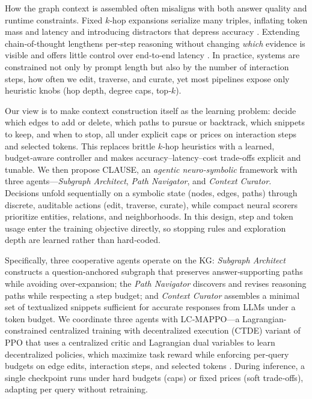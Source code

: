 \documentclass{article} %
\newcommand{\method}{\textsc{CLAUSE}\xspace}
\begin{document}
How the graph context is assembled often misaligns with both answer quality and runtime constraints. Fixed $k$‑hop expansions serialize many triples, inflating token mass and latency \citep{zhou2024efficient,wan2023efficientllms} and introducing distractors that depress accuracy \citep{jiang2019adversarialhotpot}. Extending chain‑of‑thought \citep{wei2022cot,kojima2022zeroshot} lengthens per‑step reasoning without changing \emph{which} evidence is visible and offers little control over end‑to‑end latency \citep{zhou2024efficient}. In practice, systems are constrained not only by prompt length but also by the number of interaction steps, how often we edit, traverse, and curate, yet most pipelines expose only heuristic knobs (hop depth, degree caps, top‑$k$).

Our view is to make context construction itself as the learning problem: decide which edges to add or delete, which paths to pursue or backtrack, which snippets to keep, and when to stop, all under explicit caps or prices on interaction steps and selected tokens. This replaces brittle $k$‑hop heuristics with a learned, budget‑aware controller and makes accuracy–latency–cost trade‑offs explicit and tunable. We then propose \method, an \emph{agentic neuro‑symbolic} framework with three agents—\emph{Subgraph Architect}, \emph{Path Navigator}, and \emph{Context Curator}. Decisions unfold sequentially on a symbolic state (nodes, edges, paths) through discrete, auditable actions (edit, traverse, curate), while compact neural scorers prioritize entities, relations, and neighborhoods. In this design, step and token usage enter the training objective directly, so stopping rules and exploration depth are learned rather than hard‑coded.

Specifically, three cooperative agents operate on the KG: \emph{Subgraph Architect} constructs a question‑anchored subgraph that preserves answer‑supporting paths while avoiding over‑expansion; the \emph{Path Navigator} discovers and revises reasoning paths while respecting a step budget; and \emph{Context Curator} assembles a minimal set of textualized snippets sufficient for accurate responses from LLMs under a token budget. We coordinate three agents with LC‑MAPPO—a Lagrangian-constrained centralized training with decentralized execution (CTDE) variant of PPO that uses a centralized critic and Lagrangian dual variables to learn decentralized policies, which maximize task reward while enforcing per‑query budgets on edge edits, interaction steps, and selected tokens \citep{foerster2018coma,rashid2018qmix,schulman2017ppo,yu2022surprising,achiam2017constrained,stooke2020pidlagrangian}. During inference, a single checkpoint runs under hard budgets (caps) or fixed prices (soft trade‑offs), adapting per query without retraining.
\end{document}
